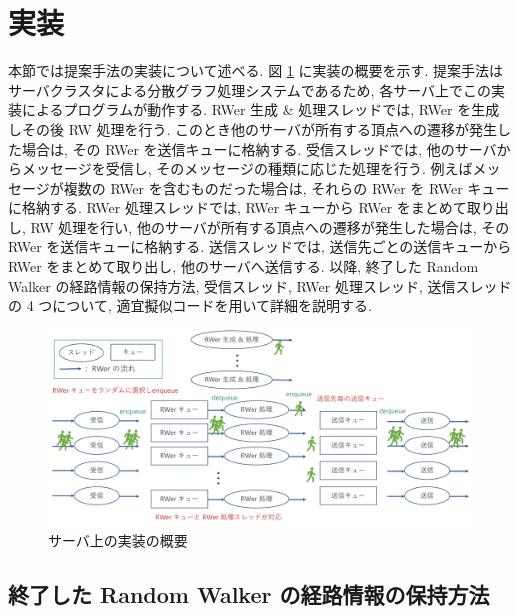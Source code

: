 \section{実装}\label{実装}

本節では提案手法の実装について述べる. 図 \ref{サーバ上の実装の概要} に実装の概要を示す. 提案手法はサーバクラスタによる分散グラフ処理システムであるため, 各サーバ上でこの実装によるプログラムが動作する. RWer 生成 \& 処理スレッドでは, RWer を生成しその後 RW 処理を行う. このとき他のサーバが所有する頂点への遷移が発生した場合は, その RWer を送信キューに格納する. 受信スレッドでは, 他のサーバからメッセージを受信し, そのメッセージの種類に応じた処理を行う. 例えばメッセージが複数の RWer を含むものだった場合は, それらの RWer を RWer キューに格納する. RWer 処理スレッドでは, RWer キューから RWer をまとめて取り出し, RW 処理を行い, 他のサーバが所有する頂点への遷移が発生した場合は, その RWer を送信キューに格納する. 送信スレッドでは, 送信先ごとの送信キューから RWer をまとめて取り出し, 他のサーバへ送信する. 以降, 終了した Random Walker の経路情報の保持方法, 受信スレッド, RWer 処理スレッド, 送信スレッドの 4 つについて, 適宜擬似コードを用いて詳細を説明する. 

\begin{figure}[t]
    \centering
    \includegraphics[scale=0.5]{figure/implementation.pdf}
    \caption{サーバ上の実装の概要}
    \label{サーバ上の実装の概要}
\end{figure}

\subsection{終了した Random Walker の経路情報の保持方法}

